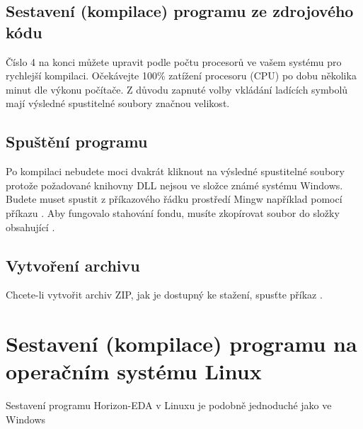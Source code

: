 \documentclass[letterpaper,10pt,czech]{sphinxmanual}
\begin{document}
\section{Sestavení (kompilace) programu ze zdrojového kódu}
\label{\detokenize{build-win32:sestaveni-kompilace-programu-ze-zdrojoveho-kodu}}
\begin{sphinxVerbatim}[commandchars=\\\{\}]
  
\end{sphinxVerbatim}

Číslo 4 na konci můžete upravit podle počtu procesorů ve vašem systému pro rychlejší kompilaci. Očekávejte 100\% zatížení procesoru (CPU) po dobu několika minut dle výkonu počítače. Z důvodu zapnuté volby vkládání ladících symbolů mají výsledné spustitelné soubory značnou velikost.


\section{Spuštění programu}
\label{\detokenize{build-win32:spusteni-programu}}
Po kompilaci nebudete moci dvakrát kliknout na výsledné spustitelné soubory protože požadované knihovny DLL nejsou ve složce známé systému Windows. Budete muset spustit z příkazového řádku prostředí Mingw například pomocí příkazu .
Aby fungovalo stahování fondu, musíte zkopírovat soubor  do složky obsahující .


\section{Vytvoření archivu}
\label{\detokenize{build-win32:vytvoreni-archivu}}
Chcete-li vytvořit archiv ZIP, jak je dostupný ke stažení, spusťte příkaz
.


\chapter{Sestavení (kompilace) programu na operačním systému Linux}
\label{\detokenize{build-linux:sestaveni-kompilace-programu-na-operacnim-systemu-linux}}\label{\detokenize{build-linux::doc}}
Sestavení programu Horizon-EDA v Linuxu je podobně jednoduché jako ve Windows
\end{document}
